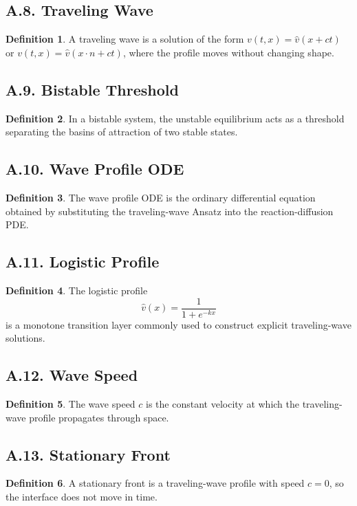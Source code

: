 \documentclass[11pt]{article}
\theoremstyle{definition}
\newtheorem{definition}{Definition}
\theoremstyle{remark}
\begin{document}
\subsection*{A.8. Traveling Wave}
\begin{definition}
A traveling wave is a solution of the form \(v(t,x)=\widehat v(x+ct)\) or \(v(t,x)=\widehat v(x\cdot n+ct)\), where the profile moves without changing shape.
\end{definition}

\subsection*{A.9. Bistable Threshold}
\begin{definition}
In a bistable system, the unstable equilibrium acts as a threshold separating the basins of attraction of two stable states.
\end{definition}

\subsection*{A.10. Wave Profile ODE}
\begin{definition}
The wave profile ODE is the ordinary differential equation obtained by substituting the traveling-wave Ansatz into the reaction-diffusion PDE.
\end{definition}

\subsection*{A.11. Logistic Profile}
\begin{definition}
The logistic profile
\[
\widehat v(x)=\frac{1}{1+e^{-kx}}
\]
is a monotone transition layer commonly used to construct explicit traveling-wave solutions.
\end{definition}

\subsection*{A.12. Wave Speed}
\begin{definition}
The wave speed \(c\) is the constant velocity at which the traveling-wave profile propagates through space.
\end{definition}

\subsection*{A.13. Stationary Front}
\begin{definition}
A stationary front is a traveling-wave profile with speed \(c=0\), so the interface does not move in time.
\end{definition}
\end{document}
